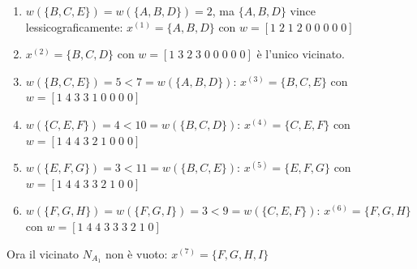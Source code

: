 \documentclass{article}
\begin{document}
\begin{enumerate}
    \item $w(\{B,C,E\})=w(\{A,B,D\})=2$, ma $\{A,B,D\}$ vince lessicograficamente:
    $x^{(1)}=\{A,B,D\}$ con $w=[1\;2\;1\;2\;0\;0\;0\;0\;0]$

    \item $x^{(2)}=\{B,C,D\}$ con $w=[1\;3\;2\;3\;0\;0\;0\;0\;0]$ è l'unico vicinato.

    \item $w(\{B,C,E\})=5<7=w(\{A,B,D\})$:
    $x^{(3)}=\{B,C,E\}$ con $w=[1\;4\;3\;3\;1\;0\;0\;0\;0]$

    \item $w(\{C,E,F\})=4<10=w(\{B,C,D\})$:
    $x^{(4)}=\{C,E,F\}$ con $w=[1\;4\;4\;3\;2\;1\;0\;0\;0]$

    \item $w(\{E,F,G\})=3<11=w(\{B,C,E\})$:
    $x^{(5)}=\{E,F,G\}$ con $w=[1\;4\;4\;3\;3\;2\;1\;0\;0]$

    \item $w(\{F,G,H\})=w(\{F,G,I\})=3<9=w(\{C,E,F\})$:
    $x^{(6)}=\{F,G,H\}$ con $w=[1\;4\;4\;3\;3\;3\;2\;1\;0]$

\end{enumerate}
Ora il vicinato $N_{A_1}$ non è vuoto: $x^{(7)}=\{F,G,H,I\}$
\end{document}
